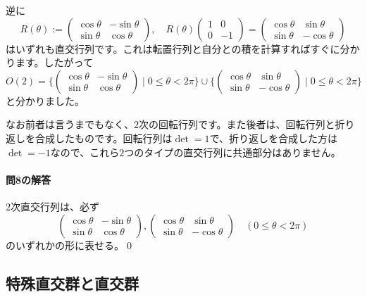逆に
\[
R(\theta) :=
\begin{pmatrix}
\cos \theta & - \sin \theta \\
\sin \theta & \cos \theta
\end{pmatrix}, \quad
R(\theta)
\begin{pmatrix}
1 & 0 \\
0 & -1
\end{pmatrix}
=
\begin{pmatrix}
\cos \theta & \sin \theta \\
\sin \theta & -\cos \theta
\end{pmatrix}
\]
はいずれも直交行列です。これは転置行列と自分との積を計算すればすぐに分かります。したがって
\[
O(2) =
\biggl\{
\begin{pmatrix}
\cos \theta & - \sin \theta \\
\sin \theta & \cos \theta
\end{pmatrix}
\mid
0 \leq \theta < 2\pi
\biggr\}
\cup
\biggl\{
\begin{pmatrix}
\cos \theta & \sin \theta \\
\sin \theta & -\cos \theta
\end{pmatrix}
\mid
0 \leq \theta < 2\pi
\biggr\}
\]
と分かりました。

なお前者は言うまでもなく、$2$次の回転行列です。また後者は、回転行列と折り返しを合成したものです。回転行列は$\det = 1$で、折り返しを合成した方は$\det = -1$なので、これら$2$つのタイプの直交行列に共通部分はありません。

\paragraph{問8の解答}
$2$次直交行列は、必ず
\[
\begin{pmatrix}
\cos \theta & - \sin \theta \\
\sin \theta & \cos \theta
\end{pmatrix},
\begin{pmatrix}
\cos \theta & \sin \theta \\
\sin \theta & -\cos \theta
\end{pmatrix} \quad (0 \leq \theta < 2\pi)
\]
のいずれかの形に表せる。\qed

\subsection{特殊直交群と直交群}

